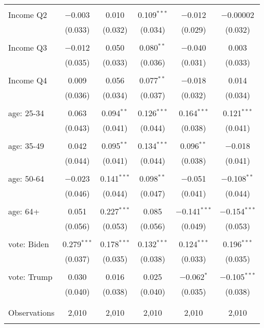 \begin{tabular}{@{\extracolsep{5pt}}lccccc}
  & & & & & \\ 
 Income Q2 & $-$0.003 & 0.010 & 0.109$^{***}$ & $-$0.012 & $-$0.00002 \\ 
  & (0.033) & (0.032) & (0.034) & (0.029) & (0.032) \\ 
  & & & & & \\ 
 Income Q3 & $-$0.012 & 0.050 & 0.080$^{**}$ & $-$0.040 & 0.003 \\ 
  & (0.035) & (0.033) & (0.036) & (0.031) & (0.033) \\ 
  & & & & & \\ 
 Income Q4 & 0.009 & 0.056 & 0.077$^{**}$ & $-$0.018 & 0.014 \\ 
  & (0.036) & (0.034) & (0.037) & (0.032) & (0.034) \\ 
  & & & & & \\ 
 age: 25-34 & 0.063 & 0.094$^{**}$ & 0.126$^{***}$ & 0.164$^{***}$ & 0.121$^{***}$ \\ 
  & (0.043) & (0.041) & (0.044) & (0.038) & (0.041) \\ 
  & & & & & \\ 
 age: 35-49 & 0.042 & 0.095$^{**}$ & 0.134$^{***}$ & 0.096$^{**}$ & $-$0.018 \\ 
  & (0.044) & (0.041) & (0.044) & (0.038) & (0.041) \\ 
  & & & & & \\ 
 age: 50-64 & $-$0.023 & 0.141$^{***}$ & 0.098$^{**}$ & $-$0.051 & $-$0.108$^{**}$ \\ 
  & (0.046) & (0.044) & (0.047) & (0.041) & (0.044) \\ 
  & & & & & \\ 
 age: 64+ & 0.051 & 0.227$^{***}$ & 0.085 & $-$0.141$^{***}$ & $-$0.154$^{***}$ \\ 
  & (0.056) & (0.053) & (0.056) & (0.049) & (0.053) \\ 
  & & & & & \\ 
 vote: Biden & 0.279$^{***}$ & 0.178$^{***}$ & 0.132$^{***}$ & 0.124$^{***}$ & 0.196$^{***}$ \\ 
  & (0.037) & (0.035) & (0.038) & (0.033) & (0.035) \\ 
  & & & & & \\ 
 vote: Trump & 0.030 & 0.016 & 0.025 & $-$0.062$^{*}$ & $-$0.105$^{***}$ \\ 
  & (0.040) & (0.038) & (0.040) & (0.035) & (0.038) \\ 
  & & & & & \\ 
\hline \\[-1.8ex] 

Observations & 2,010 & 2,010 & 2,010 & 2,010 & 2,010 \\ 
\hline 
\hline \\[-1.8ex] 
\end{tabular} 